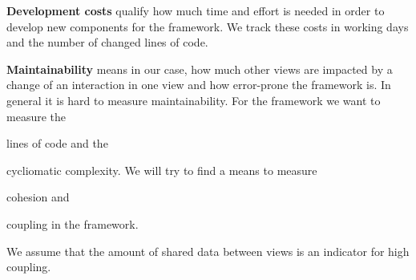 \textbf{Development costs} qualify how much time and effort is needed in order to develop new components for the \cmv{} framework.
We track these costs in working days and the number of changed lines of code.


\textbf{Maintainability} means in our case, how much other views are impacted by a change of an interaction in one view and how error-prone the framework is.
In general it is hard to measure maintainability.
For the \cmv{} framework we want to measure the
\begin{enumerate*}[label=(\arabic*)]
  \item
    lines of code and the
  \item
    cycliomatic complexity. We will try to find a means to measure
  \item
    cohesion and
  \item 
    coupling in the framework.
\end{enumerate*}
We assume that the amount of shared data between views is an indicator for high coupling.










